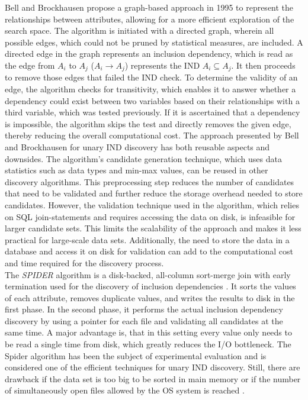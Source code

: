 \noindent Bell and Brockhausen \cite{bell1995discovery} propose a graph-based approach in 1995 to represent the relationships between attributes, allowing for a more efficient exploration of the search space. The algorithm is initiated with a directed graph, wherein all possible edges, which could not be pruned by statistical measures, are included. A directed edge in the graph represents an inclusion dependency, which is read as the edge from $A_i$ to $A_j$ ($A_i \rightarrow A_j$) represents the IND $A_i \subseteq A_j$. It then proceeds to remove those edges that failed the IND check. To determine the validity of an edge, the algorithm checks for transitivity, which enables it to answer whether a dependency could exist between two variables based on their relationships with a third variable, which was tested previously. If it is ascertained that a dependency is impossible, the algorithm skips the test and directly removes the given edge, thereby reducing the overall computational cost. The approach presented by Bell and Brockhausen for unary IND discovery has both reusable aspects and downsides. The algorithm's candidate generation technique, which uses data statistics such as data types and min-max values, can be reused in other discovery algorithms. This preprocessing step reduces the number of candidates that need to be validated and further reduce the storage overhead needed to store candidates. However, the validation technique used in the algorithm, which relies on SQL join-statements and requires accessing the data on disk, is infeasible for larger candidate sets. This limits the scalability of the approach and makes it less practical for large-scale data sets. Additionally, the need to store the data in a database and access it on disk for validation can add to the computational cost and time required for the discovery process.\\

\noindent The \textit{SPIDER} algorithm is a disk-backed, all-column sort-merge join with early termination used for the discovery of inclusion dependencies \cite{bauckmann2006efficiently}. It sorts the values of each attribute, removes duplicate values, and writes the results to disk in the first phase. In the second phase, it performs the actual inclusion dependency discovery by using a pointer for each file and validating all candidates at the same time. A major advantage is, that in this setting every value only needs to be read a single time from disk, which greatly reduces the I/O bottleneck. The Spider algorithm has been the subject of experimental evaluation and is considered one of the efficient techniques for unary IND discovery. Still, there are drawback if the data set is too big to be sorted in main memory or if the number of simultaneously open files allowed by the OS system is reached \cite{papenbrock2015divide}. \\

